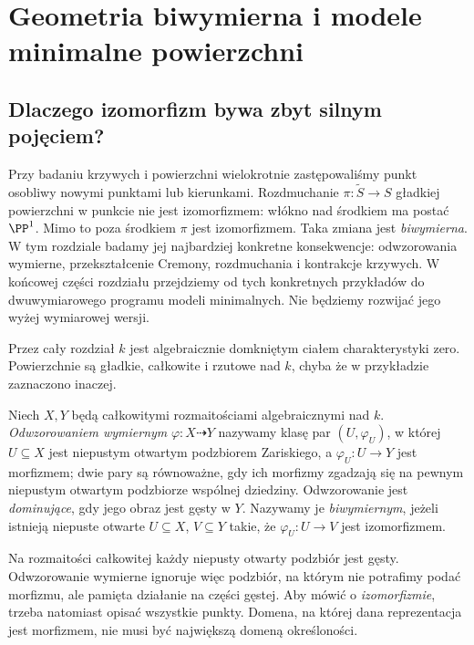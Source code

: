 \chapter{Geometria biwymierna i modele minimalne powierzchni}
\label{ch:ga8-biwymierna}

\section{Dlaczego izomorfizm bywa zbyt silnym pojęciem?}
\label{sec:ga8-motivation}

Przy badaniu krzywych i powierzchni wielokrotnie zastępowaliśmy
punkt osobliwy nowymi punktami lub kierunkami. Rozdmuchanie
$\pi:\widetilde S\to S$ gładkiej powierzchni w punkcie
nie jest izomorfizmem: włókno nad środkiem ma postać $\PP^1$.
Mimo to poza środkiem $\pi$ jest izomorfizmem. Taka zmiana
jest \emph{biwymierna}. W tym rozdziale badamy jej najbardziej
konkretne konsekwencje: odwzorowania wymierne, przekształcenie
Cremony, rozdmuchania i kontrakcje krzywych.
W końcowej części rozdziału przejdziemy od tych
konkretnych przykładów do dwuwymiarowego programu
modeli minimalnych. Nie będziemy rozwijać jego
wyżej wymiarowej wersji.

Przez cały rozdział $k$ jest algebraicznie domkniętym ciałem
charakterystyki zero. Powierzchnie są gładkie, całkowite i
rzutowe nad $k$, chyba że w przykładzie zaznaczono inaczej.

\begin{definicja}
\label{def:ga8-rational}
Niech $X,Y$ będą całkowitymi rozmaitościami algebraicznymi
nad $k$. \emph{Odwzorowaniem wymiernym} $\varphi:X\dashrightarrow Y$
nazywamy klasę par $(U,\varphi_U)$, w której $U\subseteq X$
jest niepustym otwartym podzbiorem Zariskiego, a
$\varphi_U:U\to Y$ jest morfizmem; dwie pary są równoważne,
gdy ich morfizmy zgadzają się na pewnym niepustym
otwartym podzbiorze wspólnej dziedziny. Odwzorowanie jest
\emph{dominujące}, gdy jego obraz jest gęsty w $Y$.
Nazywamy je \emph{biwymiernym}, jeżeli istnieją niepuste
otwarte $U\subseteq X$, $V\subseteq Y$ takie, że
$\varphi_U:U\to V$ jest izomorfizmem.
\end{definicja}

\begin{uwaga}
Na rozmaitości całkowitej każdy niepusty otwarty
podzbiór jest gęsty. Odwzorowanie wymierne ignoruje
więc podzbiór, na którym nie potrafimy podać morfizmu,
ale pamięta działanie na części gęstej. Aby mówić o
\emph{izomorfizmie}, trzeba natomiast opisać wszystkie punkty.
Domena, na której dana reprezentacja jest morfizmem,
nie musi być największą domeną określoności.
\end{uwaga}

